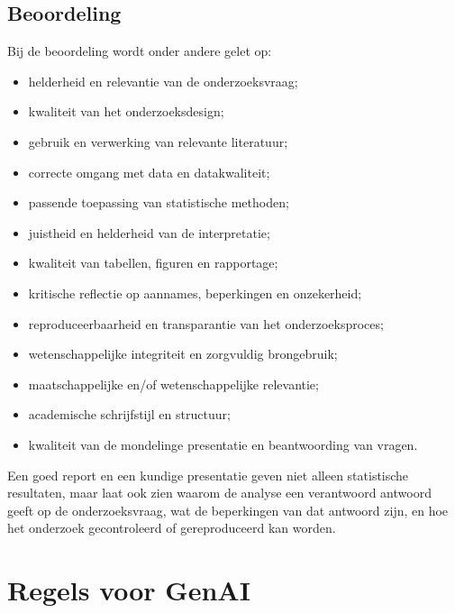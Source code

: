 \documentclass[
  letterpaper,
  DIV=11,
  numbers=noendperiod]{scrreprt}
\providecommand{\tightlist}{%
  \setlength{\itemsep}{0pt}\setlength{\parskip}{0pt}}
\begin{document}
\section*{Beoordeling}\label{beoordeling}


Bij de beoordeling wordt onder andere gelet op:

\begin{itemize}
\tightlist
\item
  helderheid en relevantie van de onderzoeksvraag;
\item
  kwaliteit van het onderzoeksdesign;
\item
  gebruik en verwerking van relevante literatuur;
\item
  correcte omgang met data en datakwaliteit;
\item
  passende toepassing van statistische methoden;
\item
  juistheid en helderheid van de interpretatie;
\item
  kwaliteit van tabellen, figuren en rapportage;
\item
  kritische reflectie op aannames, beperkingen en onzekerheid;
\item
  reproduceerbaarheid en transparantie van het onderzoeksproces;
\item
  wetenschappelijke integriteit en zorgvuldig brongebruik;
\item
  maatschappelijke en/of wetenschappelijke relevantie;
\item
  academische schrijfstijl en structuur;
\item
  kwaliteit van de mondelinge presentatie en beantwoording van vragen.
\end{itemize}

Een goed report en een kundige presentatie geven niet alleen
statistische resultaten, maar laat ook zien waarom de analyse een
verantwoord antwoord geeft op de onderzoeksvraag, wat de beperkingen van
dat antwoord zijn, en hoe het onderzoek gecontroleerd of gereproduceerd
kan worden.


\chapter*{Regels voor GenAI}\label{regels-voor-genai}

\end{document}

